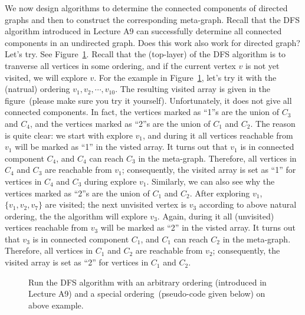 We now design algorithms to determine the connected components of directed graphs and then to construct
the corresponding meta-graph.
Recall that the DFS algorithm introduced in Lecture A9 can successfully determine all connected components in an undirected graph.
Does this work also work for directed graph? Let's try. See Figure~\ref{fig:dfs-meta}.
Recall that the (top-layer) of the DFS algorithm is to tranverse all vertices in some ordering,
and if the current vertex $v$ is not yet visited, we will explore $v$.
For the example in Figure~\ref{fig:dfs-meta}, let's try it with the (natrual) ordering $v_1, v_2, \cdots, v_{10}$.
The resulting visited array is given in the figure~(please make sure you try it yourself).
Unfortunately, it does not give all connected components. In fact, the vertices marked as ``1''s are the union of $C_3$ and $C_4$,
and the vertices marked as ``2''s are the union of $C_1$ and $C_2$.
The reason is quite clear: we start with explore $v_1$, and during it all vertices reachable from $v_1$ will be marked as ``1'' in the visted array.
It turns out that $v_1$ is in connected component $C_4$, and $C_4$ can reach $C_3$ in the meta-graph.
Therefore, all vertices in $C_4$ and $C_3$ are reachable from $v_1$; consequently, the visited array is set as ``1'' for 
vertices in $C_4$ and $C_3$ during explore $v_1$. 
Similarly, we can also see why the vertices marked as ``2''s are the union of $C_1$ and $C_2$.
After exploring $v_1$, $\{v_1,v_2,v_7\}$ are visited; the next unvisited vertex is $v_3$ according to above natural ordering,
the the algorithm will explore $v_3$.
Again, during it all (unvisited) vertices reachable from $v_3$ will be marked as ``2'' in the visted array.
It turns out that $v_3$ is in connected component $C_1$, and $C_1$ can reach $C_2$ in the meta-graph.
Therefore, all vertices in $C_1$ and $C_2$ are reachable from $v_2$;
consequently, the visited array is set as ``2'' for 
vertices in $C_1$ and $C_2$. 


\begin{figure}[h!]
\centering{}
\caption{Run the DFS algorithm with an arbitrary ordering (introduced in Lecture A9) and a special ordering~(pseudo-code given below) on above example.}
\label{fig:dfs-meta}
\end{figure}

